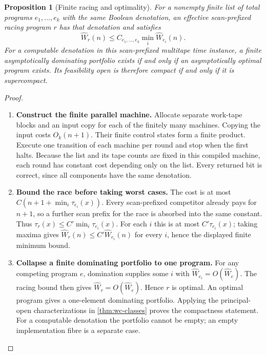 \documentclass[11pt,a4paper]{article}
\numberwithin{algorithm}{section}
\numberwithin{equation}{section}
\newtheorem{proposition}[proposition]{Proposition}
\theoremstyle{definition}
\theoremstyle{remark}
\theoremstyle{plain}
\theoremstyle{definition}
\theoremstyle{plain}
\begin{document}
\begin{proposition}[Finite racing and optimality]
\label{prop:wc-race}
For a nonempty finite list of total programs $e_1,\ldots,e_k$ with
the same Boolean denotation, an effective scan-prefixed racing program
$r$ has that denotation and satisfies
\[
 \widehat W_r(n)\le C_{e_1,\ldots,e_k}
                  \min_i\widehat W_{e_i}(n).
\]
For a computable denotation in this scan-prefixed multitape time
instance, a finite asymptotically dominating portfolio exists if and
only if an asymptotically optimal program exists. Its feasibility open
is therefore compact if and only if it is supercompact.
\end{proposition}
\begin{proof}\leavevmode
\begin{enumerate}[leftmargin=*,align=left]
\item \textbf{Construct the finite parallel machine.}
Allocate separate work-tape blocks and an input copy for each of the
finitely many machines. Copying the input costs $O_k(n+1)$. Their
finite control states form a finite product. Execute one transition
of each machine per round and stop when the first halts. Because the
list and its tape counts are fixed in this compiled machine, each
round has constant cost depending only on the list. Every returned
bit is correct, since all components have the same denotation.
\item \textbf{Bound the race before taking worst cases.}
The cost is at most $C(n+1+\min_i\tau_{e_i}(x))$.
Every scan-prefixed competitor already pays for $n+1$, so a further
scan prefix for the race is absorbed into the same constant. Thus
$\tau_r(x)\le C'\min_i\tau_{e_i}(x)$. For each $i$ this is at
most $C'\tau_{e_i}(x)$; taking maxima gives
$\widehat W_r(n)\le C'\widehat W_{e_i}(n)$ for every $i$, hence
the displayed finite minimum bound.
\item \textbf{Collapse a finite dominating portfolio to one program.}
For any competing program $e$, domination supplies some $i$ with
$\widehat W_{e_i}=O(\widehat W_e)$. The racing bound then gives
$\widehat W_r=O(\widehat W_e)$. Hence $r$ is optimal. An optimal
program gives a one-element dominating portfolio. Applying the
principal-open characterizations in \cref{thm:wc-classes} proves the
compactness statement. For a computable denotation the portfolio
cannot be empty; an empty implementation fibre is a separate case.
\end{enumerate}
\end{proof}
\end{document}
